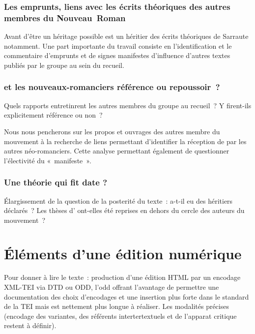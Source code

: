 \documentclass[12pt, a4paper]{article}
\begin{document}
        \subsubsection{Les emprunts, liens avec les écrits théoriques des autres membres du Nouveau~Roman}
    Avant d'être un héritage possible \punr{} est un héritier des écrits théoriques de Sarraute notamment. Une part importante du travail consiste en l'identification et le commentaire d'emprunts et de signes manifestes d'influence d'autres textes publiés par le groupe au sein du recueil.     
     
         \subsubsection{\punr{} et les nouveaux-romanciers référence ou repoussoir~?}
    Quels rapports entretinrent les autres membres du groupe au recueil~? Y firent-ils explicitement référence ou non~?

    Nous nous pencherons sur les propos et ouvrages des autres membre du mouvement à la recherche de liens permettant d'identifier la réception de \punr{} par les autres néo-romanciers. Cette analyse permettant également de questionner l'électivité du «~manifeste~».


         \subsubsection{Une théorie qui fit date ?}
     Élargissement de la question de la posterité du texte~: a-t-il eu des héritiers déclarés~? Les thèses d'\robbe{} ont-elles été reprises en dehors du cercle des auteurs du mouvement~?
     
     
     

\newpage

\section{Éléments d'une édition numérique}
Pour donner à lire le texte~: production d'une édition HTML par un encodage XML-TEI via DTD ou ODD, l'odd offrant l'avantage de permettre une documentation des choix d'encodages et une insertion plus forte dans le standard de la TEI mais est nettement plus longue à réaliser. Les modalités précises (encodage des variantes, des référents intertertextuels et de l'apparat critique restent à définir).
\end{document}
